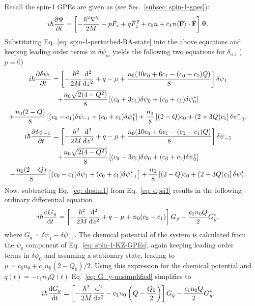 Recall the spin-1 GPEs are given as (see Sec.~\ref{subsec: spin-1-gpes}):
\begin{align}\label{eq: spin-1-KZ-GPEs}
    i\hbar\pdv{\Psi}{t} = \left[ -\frac{\hbar^2\nabla^2}{2M}
    -p\hat{F_z} + q\hat{F}_z^2 +c_0n +c_1n\langle \hat{\vb{F}}\rangle
    \cdot \hat{\vb{F}}\right]\Psi.
\end{align}
Substituting Eq.~\eqref{eq: spin-1-perturbed-BA-state} into the above equations
and keeping leading order terms in \(\delta\psi_m\) yields the following two
equations for \(\delta_{\pm 1}\) (\(p=0\))
\begin{multline}\label{eq: dpsi1}
    i\hbar\pdv{\delta\psi_1}{t} = \left[-\frac{\hbar^2}{2M}\dv[2]{}{z}+q-\mu
    + \frac{n_0(10c_0+6c_1-(c_0-c_1)Q)}{8}\right]\delta\psi_1 \\
    + \frac{n_0\sqrt{2(4-Q^2)}}{8}\left[
        (c_0 + 3c_1)\delta\psi_0
        + (c_0+c_1)\delta\psi_0^*
    \right] \\
    + \frac{n_0(2-Q)}{8}\left[(c_0-c_1)\delta\psi_{-1}
    + (c_0+c_1)\delta\psi_1^*\right]
    + \frac{n_0}{8}\left[(2-Q)c_0 + (2+3Q)c_1\right]\delta\psi_{-1}^*,
\end{multline}
\begin{multline}\label{eq: dpsim1}
    i\hbar\pdv{\delta\psi_{-1}}{t} = \left[-\frac{\hbar^2}{2M}\dv[2]{}{z}+q-\mu
    + \frac{n_0(10c_0+6c_1-(c_0-c_1)Q)}{8}\right]\delta\psi_{-1} \\
    + \frac{n_0\sqrt{2(4-Q^2)}}{8}\left[
        (c_0 + 3c_1)\delta\psi_0
        + (c_0+c_1)\delta\psi_0^*
    \right] \\
    + \frac{n_0(2-Q)}{8}\left[(c_0-c_1)\delta\psi_{1}
    + (c_0+c_1)\delta\psi_{-1}^*\right]
    + \frac{n_0}{8}\left[(2-Q)c_0 + (2+3Q)c_1\right]\delta\psi_{1}^*.
\end{multline}
Now, subtracting Eq.~\eqref{eq: dpsim1} from Eq.~\eqref{eq: dpsi1} results in
the following ordinary differential equation
\begin{align}\label{eq: G_y-unsimplified}
    i\hbar\dv{G_y}{t}= \left[ -\frac{\hbar^2}{2M}\dv[2]{}{z}+q
    -\mu+n_0(c_0+c_1)\right]G_y
    -\frac{c_1n_0Q}{2}G_y^*,
\end{align}
where \(G_y = \delta\psi_1 - \delta\psi_{-1}\).
The chemical potential of the system is calculated from the \(\psi_0\)
component of Eq.~\eqref{eq: spin-1-KZ-GPEs}, again keeping leading order terms
in \(\delta\psi_0\) and assuming a stationary state, leading to
\(\mu=c_0n_0 + c_1n_0(2 - Q_0)/2\).
Using this expression for the chemical potential and \(q(t) = -c_1n_0Q(t)\)
Eq.~\eqref{eq: G_y-unsimplified} simplifies to
\begin{align}\label{eq: G_y-simplified}
    i\hbar\dv{G_y}{t} = \left[ -\frac{\hbar^2}{2M}\dv[2]{}{z}
    -c_1n_0\left(Q-\frac{Q_0}{2}\right)\right]G_y
    - \frac{c_1n_0Q}{2}G_y^*.
\end{align}

